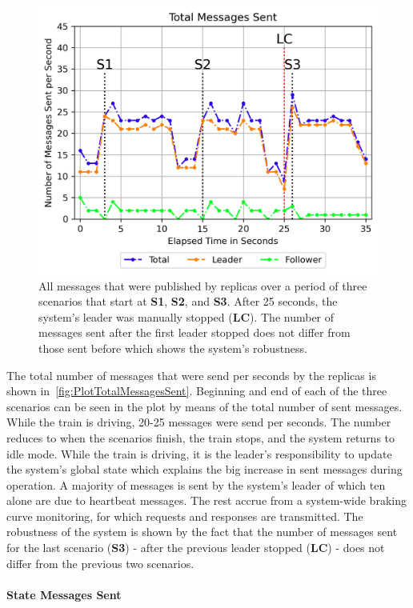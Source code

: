 \begin{figure}[!hb]
	\centering
	\includegraphics[width=0.8\linewidth]{images/plots/TotalMessagesSent}
	\caption{All messages that were published by replicas over a period of three scenarios that start at \textbf{S1}, \textbf{S2}, and \textbf{S3}. After 25 seconds, the system's leader was manually stopped (\textbf{LC}). The number of messages sent after the first leader stopped does not differ from those sent before which shows the system's robustness.}
	\label{fig:PlotTotalMessagesSent}
\end{figure}

The total number of messages that were send per seconds by the replicas is shown in~\autoref{fig:PlotTotalMessagesSent}.
Beginning and end of each of the three scenarios can be seen in the plot by means of the total number of sent messages.
While the train is driving, 20-25 messages were send per seconds.
The number reduces to when the scenarios finish, the train stops, and the system returns to idle mode.
While the train is driving, it is the leader's responsibility to update the system's global state which explains the big increase in sent messages during operation.
A majority of messages is sent by the system's leader of which ten alone are due to heartbeat messages.
The rest accrue from a system-wide braking curve monitoring, for which requests and responses are transmitted.
The robustness of the system is shown by the fact that the number of messages sent for the last scenario (\textbf{S3}) - after the previous leader stopped (\textbf{LC}) - does not differ from the previous two scenarios.

\paragraph{State Messages Sent}

